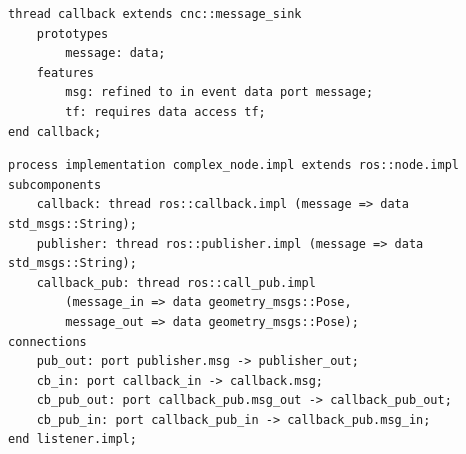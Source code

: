\begin{lstlisting}[language=AADL,caption={Callback template definition using prototypes.},label=lst:callback-proto]
thread callback extends cnc::message_sink
	prototypes
		message: data;
	features
		msg: refined to in event data port message;
		tf: requires data access tf;
end callback;
\end{lstlisting}

\begin{lstlisting}[language=AADL,caption={Implementation of a node where prototypes are refined to they final data type.},label=lst:impl-proto]
process implementation complex_node.impl extends ros::node.impl
subcomponents
	callback: thread ros::callback.impl (message => data std_msgs::String);
	publisher: thread ros::publisher.impl (message => data std_msgs::String);
	callback_pub: thread ros::call_pub.impl
		(message_in => data geometry_msgs::Pose,
		message_out => data geometry_msgs::Pose);
connections
	pub_out: port publisher.msg -> publisher_out;
	cb_in: port callback_in -> callback.msg;
	cb_pub_out: port callback_pub.msg_out -> callback_pub_out;
	cb_pub_in: port callback_pub_in -> callback_pub.msg_in;
end listener.impl;
\end{lstlisting}

